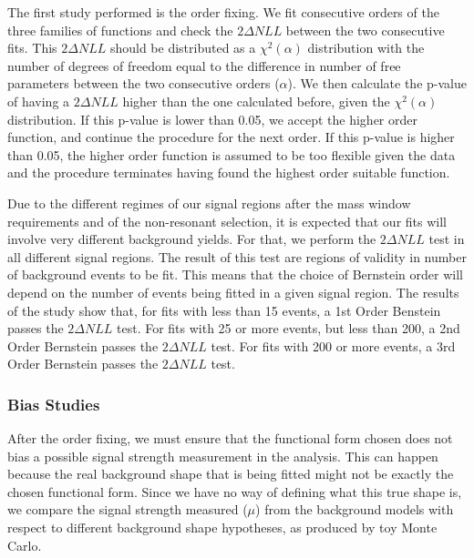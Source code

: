 
The first study performed is the order fixing. 
We fit consecutive orders of the three families of functions and check the $2\Delta NLL$ between the two consecutive fits. 
This $2\Delta NLL$ should be distributed as a $\chi^{2}(\alpha)$ distribution with the number of degrees of freedom equal to the difference in number of free parameters between the two consecutive orders ($\alpha$). 
We then calculate the p-value of having a $2\Delta NLL$ higher than the one calculated before, given the $\chi^{2}(\alpha)$ distribution. 
If this p-value is lower than 0.05, we accept the higher order function, and continue the procedure for the next order. 
If this p-value is higher than 0.05, the higher order function is assumed to be too flexible given the data and the procedure terminates having found the highest order suitable function.

Due to the different regimes of our signal regions after the mass window requirements and of the non-resonant selection, it is expected that our fits will involve very different background yields. 
For that, we perform the $2\Delta NLL$ test in all different signal regions. 
The result of this test are regions of validity in number of background events to be fit. 
This means that the choice of Bernstein order will depend on the number of events being fitted in a given signal region. 
The results of the study show that, for fits with less than 15 events, a 1st Order Benstein passes the $2\Delta NLL$ test. 
For fits with 25 or more events, but less than 200, a 2nd Order Bernstein passes the $2\Delta NLL$ test. 
For fits with 200 or more events, a 3rd Order Bernstein passes the $2\Delta NLL$ test. 

\subsubsection{Bias Studies}

After the order fixing, we must ensure that the functional form chosen does not bias a possible signal strength measurement in the analysis. This can happen because the real background shape that is being fitted might not be exactly the chosen functional form. Since we have no way of defining what this true shape is, we compare the signal strength measured ($\mu$) from the background models with respect to different background shape hypotheses, as produced by toy Monte Carlo.


